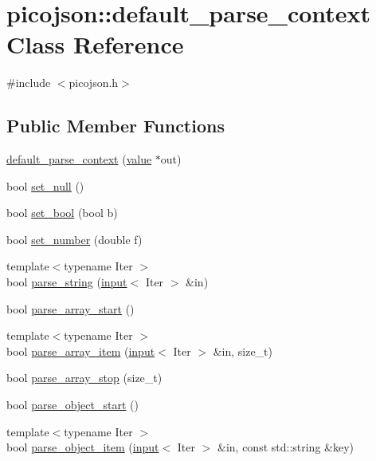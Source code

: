 \hypertarget{classpicojson_1_1default__parse__context}{}\section{picojson\+:\+:default\+\_\+parse\+\_\+context Class Reference}
\label{classpicojson_1_1default__parse__context}


{\ttfamily \#include $<$picojson.\+h$>$}

\subsection*{Public Member Functions}
\begin{DoxyCompactItemize}
\item 
\hyperlink{classpicojson_1_1default__parse__context_ad326572abe85f9d05dc23be4cf76ff3c}{default\+\_\+parse\+\_\+context} (\hyperlink{classpicojson_1_1value}{value} $\ast$out)
\item 
bool \hyperlink{classpicojson_1_1default__parse__context_a2d852ba1f0b115c89378fcb5f10580b5}{set\+\_\+null} ()
\item 
bool \hyperlink{classpicojson_1_1default__parse__context_ae1935ef455fc2bed9195426cfee5713a}{set\+\_\+bool} (bool b)
\item 
bool \hyperlink{classpicojson_1_1default__parse__context_a9b2046a9cb6d66aad835b84ffda20b86}{set\+\_\+number} (double f)
\item 
{\footnotesize template$<$typename Iter $>$ }\\bool \hyperlink{classpicojson_1_1default__parse__context_a476c7d30a5cf382b48201ec64585c2f3}{parse\+\_\+string} (\hyperlink{classpicojson_1_1input}{input}$<$ Iter $>$ \&in)
\item 
bool \hyperlink{classpicojson_1_1default__parse__context_a5c355f843ceacde134997f5bbbda1d23}{parse\+\_\+array\+\_\+start} ()
\item 
{\footnotesize template$<$typename Iter $>$ }\\bool \hyperlink{classpicojson_1_1default__parse__context_a5f65224e655633b20c1f8c5967c153bb}{parse\+\_\+array\+\_\+item} (\hyperlink{classpicojson_1_1input}{input}$<$ Iter $>$ \&in, size\+\_\+t)
\item 
bool \hyperlink{classpicojson_1_1default__parse__context_aa6ac46d87d620377429438675ba9fab2}{parse\+\_\+array\+\_\+stop} (size\+\_\+t)
\item 
bool \hyperlink{classpicojson_1_1default__parse__context_a54eba00b93ce4cdaf8b2acac4ef3e046}{parse\+\_\+object\+\_\+start} ()
\item 
{\footnotesize template$<$typename Iter $>$ }\\bool \hyperlink{classpicojson_1_1default__parse__context_adf71929b098e4f4b5c32222af149655a}{parse\+\_\+object\+\_\+item} (\hyperlink{classpicojson_1_1input}{input}$<$ Iter $>$ \&in, const std\+::string \&key)
\end{DoxyCompactItemize}
